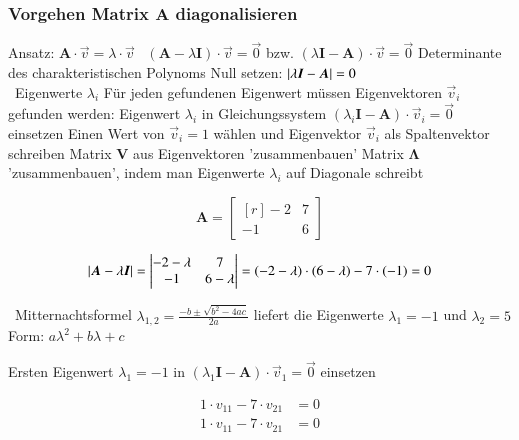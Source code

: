 \subsubsection{Vorgehen Matrix $\bm{A}$ diagonalisieren}

\begin{outline}
    \1 Ansatz: $ \bm{A} \cdot \vec{v} = \lambda \cdot \vec{v}$ \textrightarrow\ $(\bm{A} - \lambda \bm{I}) \cdot \vec{v} = \vec{0}$ bzw. 
        $(\lambda \bm{I} - \bm{A}) \cdot \vec{v} = \vec{0}$
    \1 Determinante des charakteristischen Polynoms Null setzen: $\left|\lambda \bm{I} - \bm{A}\right| = 0$ \\
        \textrightarrow\ Eigenwerte $\lambda_i$ 
    \1 Für jeden gefundenen Eigenwert müssen Eigenvektoren $\vec{v}_i$ gefunden werden:
        \2 Eigenwert $\lambda_i$ in Gleichungssystem $(\lambda_i \bm{I} - \bm{A}) \cdot \vec{v}_i = \vec{0}$ einsetzen
        \2 Einen Wert von $\vec{v}_i = 1$ wählen und Eigenvektor $\vec{v}_i$ als Spaltenvektor schreiben
    \1 Matrix $\bm{V}$ aus Eigenvektoren 'zusammenbauen'
    \1 Matrix $\bm{\Lambda}$ 'zusammenbauen', indem man Eigenwerte $\lambda_i$ auf Diagonale schreibt
\end{outline}



\begin{minipage}[c]{0.25\columnwidth}
    $$ \bm{A} = \begin{bmatrix*}[r]
        -2 & 7 \\
        -1 & 6 
    \end{bmatrix*}$$ 
\end{minipage}
\hfill
\begin{minipage}[c]{0.72\columnwidth}
    $$ \abs{\bm{A} - \lambda \bm{I}} = \begin{vmatrix*}[c]
        -2 -\lambda & 7 \\
        -1 & 6 - \lambda
    \end{vmatrix*} = (-2 - \lambda) \cdot (6 - \lambda) -7 \cdot (-1) = 0 $$
\end{minipage}

\textrightarrow\ Mitternachtsformel $\lambda_{1,2} =\frac{-b \pm \sqrt{b^2 - 4 a c}}{2a}$ liefert die Eigenwerte $\lambda_1 = -1$ und $\lambda_2 = 5$
Form: $a\lambda^2 + b\lambda + c$

\begin{minipage}[t]{0.56\columnwidth}
    Ersten Eigenwert $\lambda_1 = -1$ in $(\lambda_1 \bm{I} - \bm{A}) \cdot \vec{v}_1 = \vec{0}$ einsetzen
\end{minipage}
\hfill
\begin{minipage}[c]{0.4\columnwidth}
    \begin{align*}
        1 \cdot v_{11} - 7 \cdot v_{21} &= 0 \\
        1 \cdot v_{11} - 7 \cdot v_{21} &= 0 
    \end{align*}
\end{minipage}

